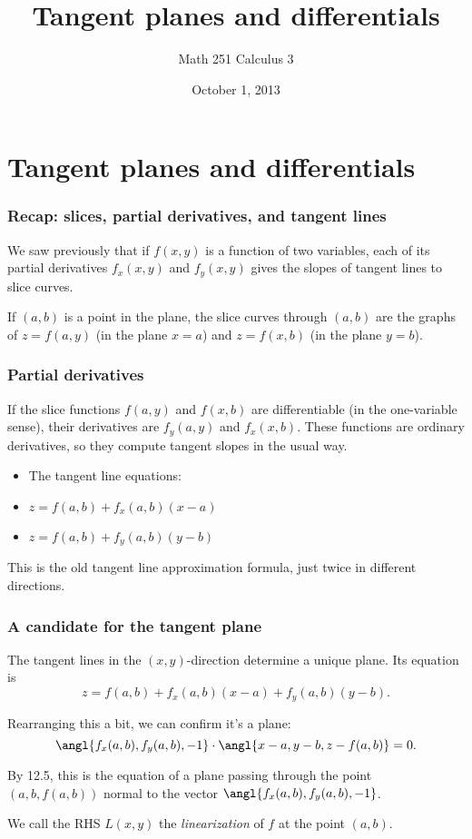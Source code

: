 \documentclass[11pt,ignorenonframetext,]{beamer}
\title{Tangent planes and differentials}
\author{Math 251 Calculus 3}
\date{October 1, 2013}
\begin{document}
\frame{\titlepage}

\section{Tangent planes and differentials}

\begin{frame}\frametitle{Recap: slices, partial derivatives, and tangent
lines}

We saw previously that if $f(x,y)$ is a function of two variables, each
of its partial derivatives $f_x(x,y)$ and $f_y(x,y)$ gives the slopes of
tangent lines to slice curves.

If $(a, b)$ is a point in the plane, the slice curves through $(a,b)$
are the graphs of $z = f(a, y)$ (in the plane $x = a$) and $z = f(x, b)$
(in the plane $y = b$).

\end{frame}

\begin{frame}\frametitle{Partial derivatives}

If the slice functions $f(a, y)$ and $f(x,b)$ are differentiable (in the
one-variable sense), their derivatives are $f_y(a,y)$ and $f_x(x,b)$.
These functions are ordinary derivatives, so they compute tangent slopes
in the usual way.

\begin{itemize}[<+->]
\itemsep1pt\parskip0pt
\item
  The tangent line equations:
\item
  $z = f(a, b) + f_x(a,b)(x - a)$
\item
  $z = f(a, b) + f_y(a,b)(y - b)$
\end{itemize}

This is the old tangent line approximation formula, just twice in
different directions.

\end{frame}

\begin{frame}\frametitle{A candidate for the tangent plane}

The tangent lines in the $(x,y)$-direction determine a unique plane. Its
equation is \[ z = f(a,b) + f_x(a,b)(x-a) + f_y(a,b)(y - b). \]

Rearranging this a bit, we can confirm it's a plane:
\[ \angl{f_x(a,b), f_y(a,b), -1} \cdot \angl{x - a, y - b, z - f(a,b)} = 0. \]

By 12.5, this is the equation of a plane passing through the point
$(a, b, f(a, b))$ normal to the vector $\angl{f_x(a,b), f_y(a,b), -1}$.

We call the RHS $L(x,y)$ the \emph{linearization} of $f$ at the point
$(a,b)$.

\end{frame}
\end{document}
